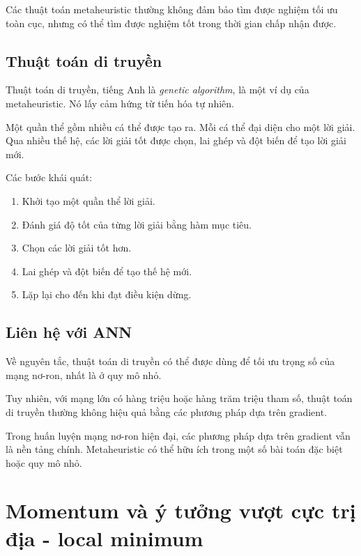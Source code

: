 Các thuật toán metaheuristic thường không đảm bảo tìm được nghiệm tối ưu toàn cục, nhưng có thể tìm được nghiệm tốt trong thời gian chấp nhận được.

\subsection{Thuật toán di truyền}

Thuật toán di truyền, tiếng Anh là \textit{genetic algorithm}, là một ví dụ của metaheuristic. Nó lấy cảm hứng từ tiến hóa tự nhiên.

Một quần thể gồm nhiều cá thể được tạo ra. Mỗi cá thể đại diện cho một lời giải. Qua nhiều thế hệ, các lời giải tốt được chọn, lai ghép và đột biến để tạo lời giải mới.

Các bước khái quát:

\begin{enumerate}
    \item Khởi tạo một quần thể lời giải.
    \item Đánh giá độ tốt của từng lời giải bằng hàm mục tiêu.
    \item Chọn các lời giải tốt hơn.
    \item Lai ghép và đột biến để tạo thế hệ mới.
    \item Lặp lại cho đến khi đạt điều kiện dừng.
\end{enumerate}

\subsection{Liên hệ với ANN}

Về nguyên tắc, thuật toán di truyền có thể được dùng để tối ưu trọng số của mạng nơ-ron, nhất là ở quy mô nhỏ.

Tuy nhiên, với mạng lớn có hàng triệu hoặc hàng trăm triệu tham số, thuật toán di truyền thường không hiệu quả bằng các phương pháp dựa trên gradient.

\begin{luuy}
Trong huấn luyện mạng nơ-ron hiện đại, các phương pháp dựa trên gradient vẫn là nền tảng chính. Metaheuristic có thể hữu ích trong một số bài toán đặc biệt hoặc quy mô nhỏ.
\end{luuy}

\section{Momentum và ý tưởng vượt cực trị địa  - local minimum}

